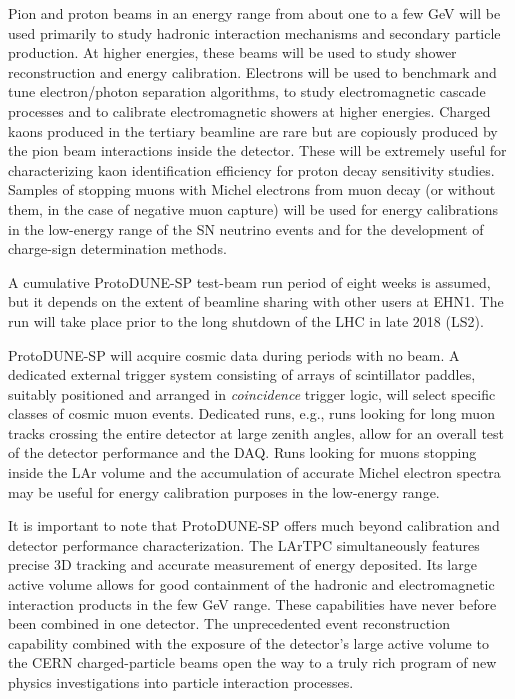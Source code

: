Pion and proton beams in an energy range from about one to a few GeV will be used primarily to study hadronic interaction mechanisms and secondary particle production.  At higher energies, these beams will be used to study shower reconstruction and energy calibration. Electrons will be used to benchmark and tune electron/photon separation algorithms, to study electromagnetic cascade processes and to calibrate electromagnetic showers at higher energies. Charged kaons produced in the tertiary beamline are rare but are copiously produced by the pion beam interactions inside the detector. These will be extremely useful for characterizing kaon identification efficiency for proton decay sensitivity studies.  Samples of stopping muons with Michel electrons from muon decay (or without them, in the case of negative muon capture) will be used for energy calibrations in the low-energy range of the SN neutrino events and for the development of charge-sign determination methods. 

A cumulative ProtoDUNE-SP test-beam run period of eight weeks is assumed, but it depends on the extent of beamline sharing with other users at EHN1. The run will take place prior to the long shutdown of the LHC in late 2018 (LS2). 

ProtoDUNE-SP will acquire cosmic data during periods with no beam. A dedicated external trigger system consisting of arrays of scintillator paddles, suitably positioned and arranged in \textit{coincidence} trigger logic, 
will select specific classes of cosmic muon events. Dedicated runs, e.g., runs looking for long muon tracks crossing the entire detector at large zenith angles, allow for an overall test of the detector performance and the DAQ. Runs looking for muons stopping inside the LAr volume and the accumulation of accurate Michel electron spectra may be useful for energy calibration purposes in the low-energy range.


It is important to note that ProtoDUNE-SP offers much beyond calibration  and detector performance characterization.  The LArTPC simultaneously features precise 3D tracking and accurate measurement of energy deposited. Its large active volume allows for good containment of the hadronic and electromagnetic interaction products in the few GeV range. These capabilities have never before been combined in one detector.  The unprecedented event reconstruction capability combined with the exposure of the detector's large active volume to the CERN charged-particle beams open the way to a truly rich program of new physics investigations into particle interaction processes. 


